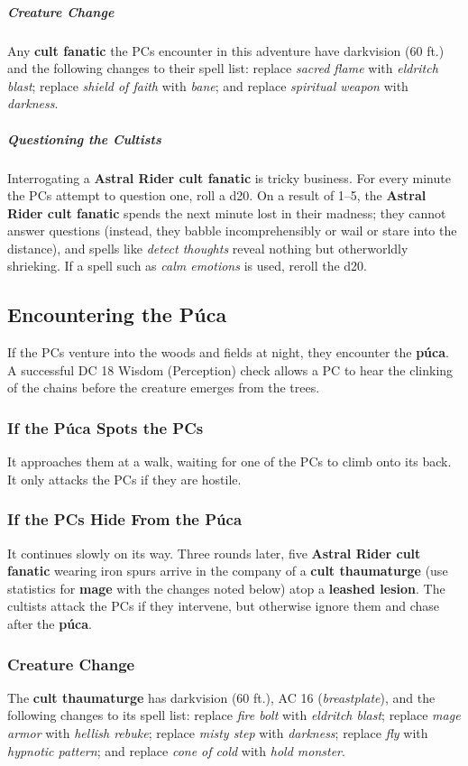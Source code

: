 \documentclass[10pt,a4paper,twoside,bg=print,twocolumn,openany,nodeprecatedcode]{dndbook}
\begin{document}
\subparagraph{Creature Change}
Any \textbf{cult fanatic} the PCs encounter in this adventure have darkvision (60 ft.) and the following changes to their spell list: replace \textit{sacred flame} with \textit{eldritch blast}; replace \textit{shield of faith} with \textit{bane}; and replace \textit{spiritual weapon} with \textit{darkness}.

\subparagraph{Questioning the Cultists}
Interrogating a \textbf{Astral Rider cult fanatic} is tricky business. For every minute the PCs attempt to question one, roll a d20. On a result of 1–5, the \textbf{Astral Rider cult fanatic} spends the next minute lost in their madness; they cannot answer questions (instead, they babble incomprehensibly or wail or stare into the distance), and spells like \textit{detect thoughts} reveal nothing but otherworldly shrieking. If a spell such as \textit{calm emotions} is used, reroll the d20.

\subsection{Encountering the Púca}
If the PCs venture into the woods and fields at night, they encounter the \textbf{púca}. A successful DC 18 Wisdom (Perception) check allows a PC to hear the clinking of the chains before the creature emerges from the trees.

\subsubsection{If the Púca Spots the PCs}
It approaches them at a walk, waiting for one of the PCs to climb onto its back. It only attacks the PCs if they are hostile.

\subsubsection{If the PCs Hide From the Púca}
It continues slowly on its way. Three rounds later, five \textbf{Astral Rider cult fanatic} wearing iron spurs arrive in the company of a \textbf{cult thaumaturge} (use statistics for \textbf{mage} with the changes noted below) atop a \textbf{leashed lesion}. The cultists attack the PCs if they intervene, but otherwise ignore them and chase after the \textbf{púca}.

\subsubsection{Creature Change}
The \textbf{cult thaumaturge} has darkvision (60 ft.), AC 16 (\textit{breastplate}), and the following changes to its spell list: replace \textit{fire bolt} with \textit{eldritch blast}; replace \textit{mage armor} with \textit{hellish rebuke}; replace \textit{misty step} with \textit{darkness}; replace \textit{fly} with \textit{hypnotic pattern}; and replace \textit{cone of cold} with \textit{hold monster}.
\end{document}
